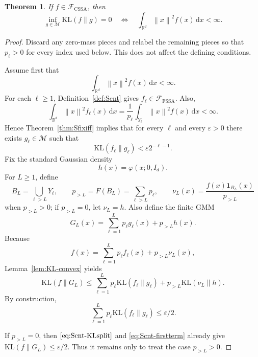\documentclass[11pt]{article}
\newtheorem{theorem}{Theorem}[section]
\theoremstyle{definition}
\begin{document}
\begin{theorem}
\label{thm:Scntiff}
If $f\in\mathcal F_{\mathrm{CSSA}}$, then
\[
\inf_{g\in\mathcal M}\mathrm{KL}(f\|g)=0
\quad\Longleftrightarrow\quad
\int_{\mathbb{R}^d}\left\lVert x \right\rVert^2f(x)\,\mathrm{d}x<\infty.
\]
\end{theorem}

\begin{proof}
Discard any zero-mass pieces and relabel the remaining pieces so that $p_\ell>0$ for every index used below. This does not affect the defining conditions.

Assume first that
\[
\int_{\mathbb{R}^d}\left\lVert x \right\rVert^2f(x)\,\mathrm{d}x<\infty.
\]
For each $\ell\ge1$, Definition~\ref{def:Scnt} gives $f_\ell\in\mathcal F_{\mathrm{FSSA}}$. Also,
\[
\int_{\mathbb{R}^d}\left\lVert x \right\rVert^2 f_\ell(x)\,\mathrm{d}x
=\frac{1}{p_\ell}\int_{Y_\ell}\left\lVert x \right\rVert^2f(x)\,\mathrm{d}x<\infty.
\]
Hence Theorem~\ref{thm:Sfixiff} implies that for every $\ell$ and every $\varepsilon>0$ there exists $g_\ell\in\mathcal M$ such that
\[
\mathrm{KL}(f_\ell\|g_\ell)<\varepsilon 2^{-\ell-1}.
\]
Fix the standard Gaussian density
\[
h(x)=\varphi(x;0,I_d).
\]
For $L\ge1$, define
\[
B_L=\bigcup_{\ell>L}Y_\ell,
\qquad
p_{>L}=F(B_L)=\sum_{\ell>L}p_\ell,
\qquad
\nu_L(x)=\frac{f(x)\mathbf{1}_{B_L}(x)}{p_{>L}}
\]
when $p_{>L}>0$; if $p_{>L}=0$, let $\nu_L=h$. Also define the finite GMM
\[
G_L(x)=\sum_{\ell=1}^L p_\ell g_\ell(x)+p_{>L}h(x).
\]
Because
\[
f(x)=\sum_{\ell=1}^L p_\ell f_\ell(x)+p_{>L}\nu_L(x),
\]
Lemma~\ref{lem:KL-convex} yields
\begin{equation}
\label{eq:Scnt-KLsplit}
\mathrm{KL}(f\|G_L)
\le \sum_{\ell=1}^L p_\ell\mathrm{KL}(f_\ell\|g_\ell)+p_{>L}\mathrm{KL}(\nu_L\|h).
\end{equation}
By construction,
\begin{equation}
\label{eq:Scnt-firstterm}
\sum_{\ell=1}^L p_\ell\mathrm{KL}(f_\ell\|g_\ell)\le \varepsilon/2.
\end{equation}

If $p_{>L}=0$, then $\eqref{eq:Scnt-KLsplit}$ and \eqref{eq:Scnt-firstterm} already give $\mathrm{KL}(f\|G_L)\le \varepsilon/2$. Thus it remains only to treat the case $p_{>L}>0$.


\end{proof}
\end{document}

